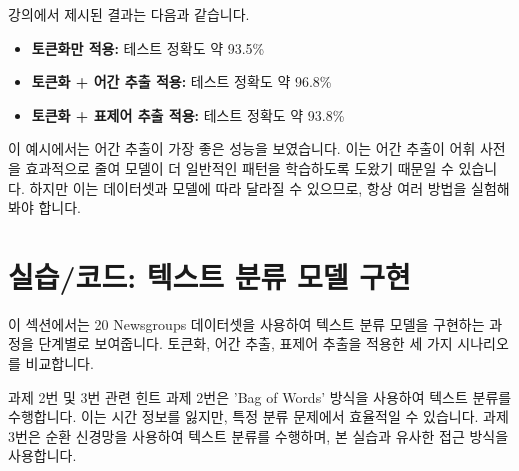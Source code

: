 \documentclass[11pt,a4paper]{article}
\begin{document}
\begin{tcolorbox}[title=\textbf{전처리 기법별 성능 비교 (예시)}, colback=myblue!10!white, colframe=myblue!75!black]
강의에서 제시된 결과는 다음과 같습니다.
\begin{itemize}
    \item \textbf{토큰화만 적용:} 테스트 정확도 약 93.5\%
    \item \textbf{토큰화 + 어간 추출 적용:} 테스트 정확도 약 96.8\%
    \item \textbf{토큰화 + 표제어 추출 적용:} 테스트 정확도 약 93.8\%
\end{itemize}
이 예시에서는 어간 추출이 가장 좋은 성능을 보였습니다. 이는 어간 추출이 어휘 사전을 효과적으로 줄여 모델이 더 일반적인 패턴을 학습하도록 도왔기 때문일 수 있습니다. 하지만 이는 데이터셋과 모델에 따라 달라질 수 있으므로, 항상 여러 방법을 실험해봐야 합니다.
\end{tcolorbox}

\newpage
\section*{실습/코드: 텍스트 분류 모델 구현}
이 섹션에서는 20 Newsgroups 데이터셋을 사용하여 텍스트 분류 모델을 구현하는 과정을 단계별로 보여줍니다. 토큰화, 어간 추출, 표제어 추출을 적용한 세 가지 시나리오를 비교합니다.

\begin{tipbox}{과제 2번 및 3번 관련 힌트}
과제 2번은 'Bag of Words' 방식을 사용하여 텍스트 분류를 수행합니다. 이는 시간 정보를 잃지만, 특정 분류 문제에서 효율적일 수 있습니다. 과제 3번은 순환 신경망을 사용하여 텍스트 분류를 수행하며, 본 실습과 유사한 접근 방식을 사용합니다.
\end{tipbox}
\end{document}
